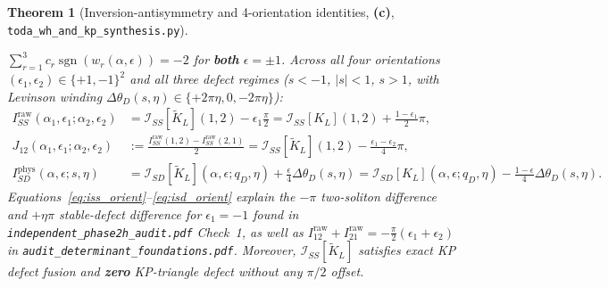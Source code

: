 \documentclass[11pt,a4paper]{article}
\newcommand{\Lc}{\textsf{\textbf{(c)}}}
\newcommand{\scrshort}{\texttt{toda\_\allowbreak wh\_\allowbreak and\_\allowbreak kp\_\allowbreak synthesis.py}}
\newtheorem{theorem}{Theorem}[section]
\theoremstyle{remark}
\begin{document}
\begin{theorem}[Inversion-antisymmetry and 4-orientation identities, \Lc, \scrshort]
\begin{enumerate}
  $\sum_{r=1}^3 c_r\operatorname{sgn}(w_r(\alpha,\epsilon)) = -2$ for \textbf{both} $\epsilon = \pm 1$.
  Across all four orientations $(\epsilon_1,\epsilon_2) \in \{+1,-1\}^2$ and all three defect regimes
  ($s < -1$, $|s| < 1$, $s > 1$, with Levinson winding $\Delta\theta_D(s,\eta) \in \{+2\pi\eta, 0, -2\pi\eta\}$):
  \begin{align}
    I_{SS}^{\mathrm{raw}}(\alpha_1,\epsilon_1;\alpha_2,\epsilon_2)
    &= \mathcal{I}_{SS}[\widetilde{K}_L](1,2) - \epsilon_1\frac{\pi}{2}
     = \mathcal{I}_{SS}[K_L](1,2) + \frac{1-\epsilon_1}{2}\pi, \label{eq:iss_orient}\\
    J_{12}(\alpha_1,\epsilon_1;\alpha_2,\epsilon_2)
    &:= \frac{I_{SS}^{\mathrm{raw}}(1,2) - I_{SS}^{\mathrm{raw}}(2,1)}{2}
     = \mathcal{I}_{SS}[\widetilde{K}_L](1,2) - \frac{\epsilon_1 - \epsilon_2}{4}\pi, \label{eq:j12_orient}\\
    I_{SD}^{\mathrm{phys}}(\alpha,\epsilon;s,\eta)
    &= \mathcal{I}_{SD}[\widetilde{K}_L](\alpha,\epsilon;q_D,\eta) + \frac{\epsilon}{4}\Delta\theta_D(s,\eta)
     = \mathcal{I}_{SD}[K_L](\alpha,\epsilon;q_D,\eta) - \frac{1-\epsilon}{4}\Delta\theta_D(s,\eta). \label{eq:isd_orient}
  \end{align}
  Equations~\eqref{eq:iss_orient}--\eqref{eq:isd_orient} explain the $-\pi$ two-soliton difference and
  $+\eta\pi$ stable-defect difference for $\epsilon_1 = -1$ found in \texttt{independent\_phase2h\_audit.pdf}
  Check~1, as well as $I_{12}^{\mathrm{raw}} + I_{21}^{\mathrm{raw}} = -\frac{\pi}{2}(\epsilon_1+\epsilon_2)$
  in \texttt{audit\_determinant\_foundations.pdf}. Moreover, $\mathcal{I}_{SS}[\widetilde{K}_L]$ satisfies
  exact KP defect fusion and \textbf{zero} KP-triangle defect without any $\pi/2$ offset.
\end{enumerate}
\end{theorem}
\end{document}
